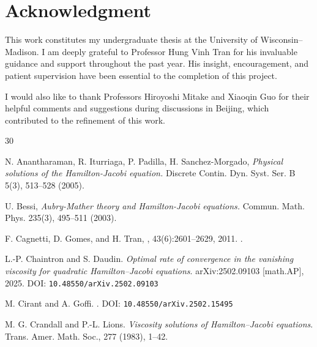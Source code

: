 \documentclass[12pt,reqno]{amsart}
\numberwithin{figure}{section}
\theoremstyle{plain}
\numberwithin{equation}{section}
\begin{document}
\section*{Acknowledgment}
This work constitutes my undergraduate thesis at the University of Wisconsin–Madison. I am deeply grateful to Professor Hung Vinh Tran for his invaluable guidance and support throughout the past year. His insight, encouragement, and patient supervision have been essential to the completion of this project.

I would also like to thank Professors Hiroyoshi Mitake and Xiaoqin Guo for their helpful comments and suggestions during discussions in Beijing, which contributed to the refinement of this work.


\begin{thebibliography}{30} 

N. Anantharaman, R. Iturriaga, P. Padilla, H. Sanchez-Morgado,  
\emph{Physical solutions of the Hamilton-Jacobi equation.} 
Discrete Contin. Dyn. Syst. Ser. B 5(3), 513–528 (2005).

U. Bessi, 
\emph{Aubry-Mather theory and Hamilton-Jacobi equations.} 
Commun. Math. Phys. 235(3), 495–511 (2003).

F. Cagnetti, D. Gomes, and H. Tran,
, 43(6):2601--2629, 2011.
.

{L.-P. Chaintron and S. Daudin.}  
\textit{Optimal rate of convergence in the vanishing viscosity for quadratic Hamilton--Jacobi equations}.  arXiv:2502.09103 [math.AP], 2025.  
DOI: \texttt{10.48550/arXiv.2502.09103}


M. Cirant and A. Goffi.  
.  
DOI: \texttt{10.48550/arXiv.2502.15495}

M. G. Crandall and P.-L. Lions.  
\textit{Viscosity solutions of Hamilton--Jacobi equations}.  Trans. Amer. Math. Soc., 277 (1983), 1--42.


\end{thebibliography}
\end{document}
